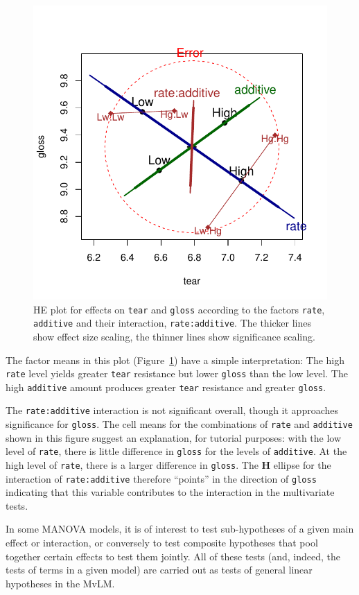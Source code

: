 \documentclass[11pt]{article}
\newcommand{\mat}[1]{\ensuremath{\bm{#1}}}
\newcommand*{\MLM}{MvLM\xspace}
\newcommand{\figref}[1]{Figure~\ref{#1}}
\newcommand{\code}[1]{{\texttt{#1}}}
\begin{document}
\begin{figure}[htb]
\begin{center}
	\includegraphics[width=.6\textwidth, clip]{plot-plastic1}
\caption{HE plot for effects on \code{tear} and \code{gloss} according to the
	factors \code{rate}, \code{additive} and their interaction, \code{rate:additive}.
	 The thicker
	lines show effect size scaling, the thinner lines show significance scaling.}
\label{fig:plastic1}
\end{center}
\end{figure}


The factor means in this plot (\figref{fig:plastic1}) have a simple interpretation:
The high \code{rate} level yields greater \code{tear} resistance but lower \code{gloss}
than the low level.
The high \code{additive} amount produces greater \code{tear} resistance and greater \code{gloss}.

The \code{rate:additive} interaction is not significant overall, though it
approaches significance for \code{gloss}. 
The cell means for the combinations
of \code{rate} and \code{additive} shown in this figure suggest an explanation,
for tutorial purposes:
with the low level of \code{rate}, there is little difference in \code{gloss}
for the levels of \code{additive}. At the high level of \code{rate}, there is
a larger difference in \code{gloss}.  The \mat{H} ellipse for the interaction
of \code{rate:additive} therefore ``points'' in the direction of \code{gloss}
indicating that this variable contributes to the interaction in the 
multivariate tests.


In some MANOVA models, it is of interest to test sub-hypotheses 
of a given main effect or interaction, or conversely to test composite
hypotheses that pool together certain effects to test them jointly.
All of these tests (and, indeed, the tests of terms in a given model)
are carried out as tests of general linear hypotheses in the \MLM.
\end{document}
